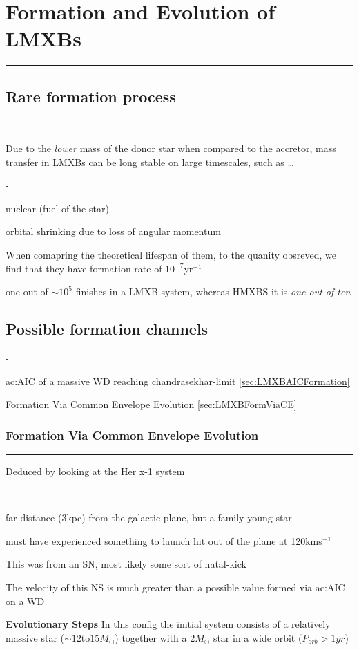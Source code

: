 \pagebreak
\setcounter{section}{10}
\chapter{Formation and Evolution of LMXBs}
\hrule
\vspace{.5cm}

\section{Rare formation process}
\begin{list}{-}{}
\item Due to the \textit{lower} mass of the donor star when compared to the accretor, mass transfer in LMXBs can be long stable on large timescales, such as \dots
\begin{list}{-}{}
\item nuclear (fuel of the star)
\item orbital shrinking due to loss of angular momentum
\end{list}
\item When comapring the theoretical lifespan of them, to the quanity obsreved, we find that they have formation rate of \( 10^{-7} \text{yr}^{-1}\)
\item one out of \(\sim 10^{5}\) finishes in a LMXB system, whereas HMXBS it is \textit{one out of ten} 
\end{list}

\section{Possible formation channels}
\begin{list}{-}{}
\item \gls{ac:AIC} of a massive WD reaching \gls{chandrasekhar-limit} \ref{sec:LMXBAICFormation}
\item Formation Via Common Envelope Evolution \ref{sec:LMXBFormViaCE}
\end{list}
\pagebreak
\subsection{Formation Via Common Envelope Evolution\label{sec:LMXBFormViaCE}}
\hrule
\vspace{.5cm}
Deduced by looking at the Her x-1 system 
\begin{list}{-}{}
\item far distance (3kpc) from the galactic plane, but a family young star
\item must have experienced something to launch hit out of the plane at 120kms\(^{-1}\)
\item This was from an SN, most likely some sort of \gls{natal-kick}
\item The velocity of this NS is much greater than a possible value formed via \gls{ac:AIC} on a WD
\end{list}
\textbf{Evolutionary Steps}
In this config the initial system consists of a relatively massive star (\(\sim 12 \text{to} 15 M_\odot\)) together with a \(2M_\odot\) star in a wide orbit (\(P_{orb} > 1yr\)) 

